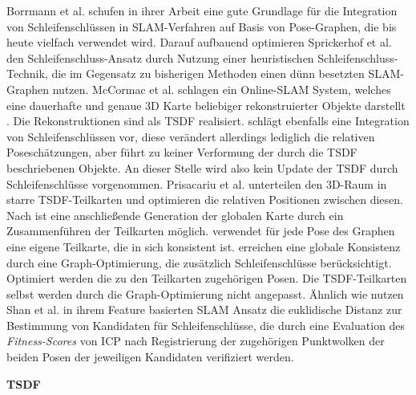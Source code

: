 Borrmann et al. \cite{borrmann2008globally} schufen in ihrer Arbeit eine gute Grundlage für die Integration von Schleifenschlüssen in SLAM-Verfahren auf Basis von Pose-Graphen, die bis heute vielfach verwendet wird.
Darauf aufbauend optimieren Sprickerhof et al. \cite{sprickerhof2011heuristic} den Schleifenschluss-Ansatz durch Nutzung einer heuristischen Schleifenschluss-Technik, die im Gegensatz zu bisherigen Methoden einen dünn besetzten SLAM-Graphen nutzen.
McCormac et al. \cite{mccormac2018fusion++} schlagen ein Online-SLAM System, welches eine dauerhafte und genaue 3D Karte beliebiger rekonstruierter Objekte darstellt \cite{mccormac2018fusion++}. Die Rekonstruktionen sind als TSDF realisiert. \cite{mccormac2018fusion++} schlägt ebenfalls eine Integration von Schleifenschlüssen vor, diese verändert allerdings lediglich die relativen Poseschätzungen, aber führt zu keiner Verformung der durch die TSDF beschriebenen Objekte. An dieser Stelle wird also kein Update der TSDF durch Schleifenschlüsse vorgenommen.
Prisacariu et al. \cite{prisacariu2017infinitam} unterteilen den 3D-Raum in starre TSDF-Teilkarten und optimieren die relativen Positionen zwischen diesen. Nach \cite{prisacariu2017infinitam} ist eine anschließende Generation der globalen Karte durch ein Zusammenführen der Teilkarten möglich. \cite{prisacariu2017infinitam} verwendet für jede Pose des Graphen eine eigene Teilkarte, die in sich konsistent ist. \cite{prisacariu2017infinitam} erreichen eine globale Konsistenz durch eine Graph-Optimierung, die zusätzlich Schleifenschlüsse berücksichtigt. Optimiert werden die zu den Teilkarten zugehörigen Posen. Die TSDF-Teilkarten selbst werden durch die Graph-Optimierung nicht angepasst.
Ähnlich wie \cite{borrmann2008globally} nutzen Shan et al. \cite{shan2020lio} in ihrem Feature basierten SLAM Ansatz die euklidische Distanz zur Bestimmung von Kandidaten für Schleifenschlüsse, die durch eine Evaluation des \emph{Fitness-Scores} von ICP nach Registrierung der zugehörigen Punktwolken der beiden Posen der jeweiligen Kandidaten verifiziert werden.

\textbf{TSDF}

